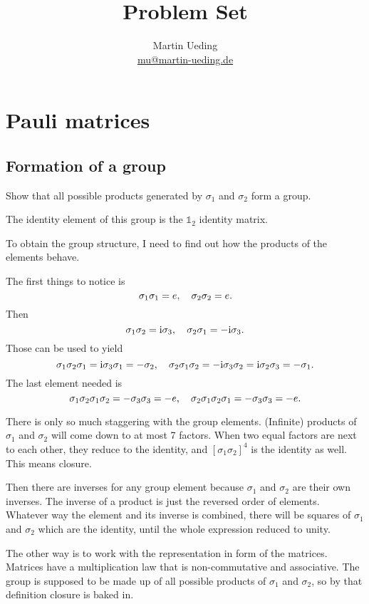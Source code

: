 \documentclass[11pt, english, fleqn, DIV=15, headinclude, BCOR=1cm]{scrartcl}
\title{Problem Set \arabic{problemset}}
\author{
    Martin Ueding \\ \small{\href{mailto:mu@martin-ueding.de}{mu@martin-ueding.de}}
}
\begin{document}
\maketitle

\section{Pauli matrices}

\newcommand\1{\sigma_1}
\newcommand\2{\sigma_2}
\newcommand\3{\sigma_3}

\subsection{Formation of a group}

\begin{problem}
    Show that all possible products generated by $\1$ and $\2$ form a group.
\end{problem}

The identity element of this group is the $\mathbb 1_2$ identity matrix.

To obtain the group structure, I need to find out how the products of the
elements behave.

The first things to notice is
\[
    \1\1 = e
    \eqnsep
    \2\2 = e.
\]
Then
\[
    \1\2 = \iup \3
    \eqnsep
    \2\1 = - \iup \3.
\]
Those can be used to yield
\[
    \1\2\1 = \iup \3 \1 = - \2
    \eqnsep
    \2\1\2 = - \iup \3 \2 = \iup \2\3 = - \1.
\]
The last element needed is
\[
    \1\2\1\2 = - \3\3 = - e
    \eqnsep
    \2\1\2\1 = - \3\3 = - e.
\]

There is only so much staggering with the group elements. (Infinite) products
of $\1$ and $\2$ will come down to at most 7 factors. When two equal factors
are next to each other, they reduce to the identity, and $[\1\2]^4$ is the
identity as well. This means closure.

Then there are inverses for any group element because $\1$ and $\2$ are their
own inverses. The inverse of a product is just the reversed order of elements.
Whatever way the element and its inverse is combined, there will be squares of
$\1$ and $\2$ which are the identity, until the whole expression reduced to
unity.

The other way is to work with the representation in form of the matrices.
Matrices have a multiplication law that is non-commutative and associative. The
group is supposed to be made up of all possible products of $\1$ and $\2$, so
by that definition closure is baked in.
\end{document}
